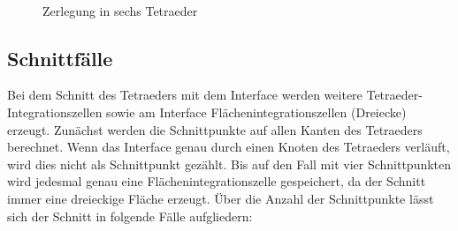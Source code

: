 \begin{figure}[ht]
\centering
{}
\qquad
\\
\caption{Zerlegung in sechs Tetraeder}
\label{fig:decomp}
\end{figure}

\subsection{Schnittfälle}
Bei dem Schnitt des Tetraeders mit dem Interface werden weitere Tetraeder-Integrationszellen sowie am Interface Flächenintegrationszellen (Dreiecke) erzeugt. Zunächst werden die Schnittpunkte auf allen Kanten des Tetraeders berechnet. Wenn das Interface genau durch einen Knoten des Tetraeders verläuft, wird dies nicht als Schnittpunkt gezählt. Bis auf den Fall mit vier Schnittpunkten wird jedesmal genau eine Flächenintegrationszelle gespeichert, da der Schnitt immer eine dreieckige Fläche erzeugt. Über die Anzahl der Schnittpunkte lässt sich der Schnitt in folgende Fälle aufgliedern:

